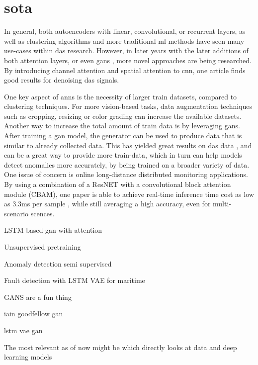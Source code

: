 \section{\acrshort{sota}}

In general, both autoencoders with linear, convolutional, or recurrent layers, as well as clustering algorithms and more traditional \acrshort{ml} methods have seen many use-cases within \acrshort{das} research. However, in later years with the later additions of both attention layers, or even \acrshort{gan}s \cite{goodfellow2014generative, goodfellow2016nips}, more novel approaches are being researched. By introducing channel attention and spatial attention to \acrshort{cnn}, one article \cite{eage:/content/journals/10.1111/1365-2478.13355} finds good results for denoising \acrshort{das} signals. 

One key aspect of \acrshort{ann}s is the necessity of larger train datasets, compared to clustering techniques. For more vision-based tasks, data augmentation techniques such as cropping, resizing or color grading can increase the available datasets. Another way to increase the total amount of train data is by leveraging \acrshort{gan}s. After training a \acrshort{gan} model, the generator can be used to produce data that is similar to already collected data. This has yielded great results on \acrshort{das} data \cite{Shiloh:19}, and can be a great way to provide more train-data, which in turn can help models detect anomalies more accurately, by being trained on a broader variety of data. \\

One issue of concern is online long-distance distributed monitoring applications. By using a combination of a ResNET with a convolutional block attention module (CBAM), one paper is able to achieve real-time inference time cost as low as 3.3ms per sample \cite{photonics9100677}, while still averaging a high accuracy, even for multi-scenario scences. 


LSTM based gan with attention \cite{bashar2023algan} 

Unsupervised pretraining \cite{alaaDeepLstm2019}

Anomaly detection semi supervised \cite{huang2021esad}

Fault detection with LSTM VAE for maritime \cite{9514856} 

GANS are a fun thing \cite{jiang2023unsupervised}

iain goodfellow gan \cite{goodfellow2016nips}

lstm vae gan \cite{s20133738}


The most relevant as of now might be \cite{s21196627} which directly looks at  data and deep learning models